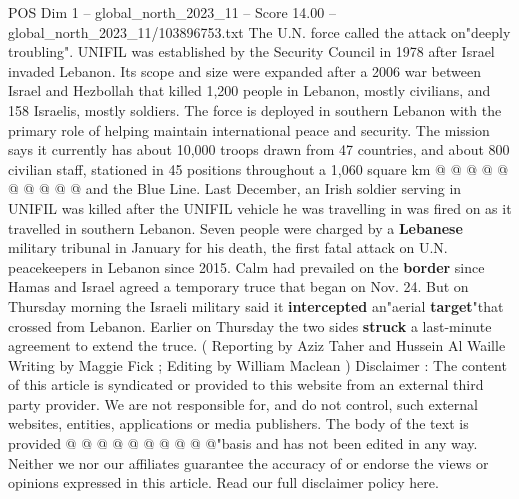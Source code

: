 \begin{textsample}{POS Dim 1 – global\_north\_2023\_11 – Score 14.00 – global\_north\_2023\_11/103896753.txt}
The U.N. force called the attack on"deeply troubling".
UNIFIL was established by the Security Council in 1978 after Israel invaded Lebanon.
Its scope and size were expanded after a 2006 war between Israel and Hezbollah that killed 1,200 people in Lebanon, mostly civilians, and 158 Israelis, mostly soldiers.
The force is deployed in southern Lebanon with the primary role of helping maintain international peace and security.
The mission says it currently has about 10,000 troops drawn from 47 countries, and about 800 civilian staff, stationed in 45 positions throughout a 1,060 square km @ @ @ @ @ @ @ @ @ @ and the Blue Line.
Last December, an Irish soldier serving in UNIFIL was killed after the UNIFIL vehicle he was travelling in was fired on as it travelled in southern Lebanon.
Seven people were charged by a \textbf{Lebanese} military tribunal in January for his death, the first fatal attack on U.N. peacekeepers in Lebanon since 2015.
Calm had prevailed on the \textbf{border} since Hamas and Israel agreed a temporary truce that began on Nov. 24.
But on Thursday morning the Israeli military said it \textbf{intercepted} an"aerial \textbf{target}"that crossed from Lebanon.
Earlier on Thursday the two sides \textbf{struck} a last-minute agreement to extend the truce. ( Reporting by Aziz Taher and Hussein Al Waille Writing by Maggie Fick ; Editing by William Maclean ) Disclaimer : The content of this article is syndicated or provided to this website from an external third party provider.
We are not responsible for, and do not control, such external websites, entities, applications or media publishers.
The body of the text is provided @ @ @ @ @ @ @ @ @ @"basis and has not been edited in any way.
Neither we nor our affiliates guarantee the accuracy of or endorse the views or opinions expressed in this article.
Read our full disclaimer policy here.

\end{textsample}
